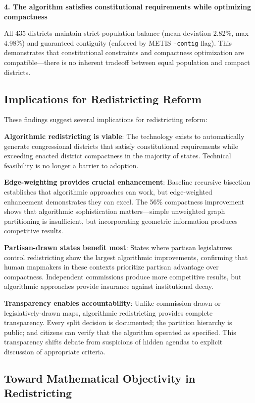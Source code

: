\textbf{4. The algorithm satisfies constitutional requirements while optimizing compactness}

All 435 districts maintain strict population balance (mean deviation 2.82\%, max 4.98\%) and guaranteed contiguity (enforced by METIS \texttt{-contig} flag). This demonstrates that constitutional constraints and compactness optimization are compatible—there is no inherent tradeoff between equal population and compact districts.

\subsection{Implications for Redistricting Reform}

These findings suggest several implications for redistricting reform:

\textbf{Algorithmic redistricting is viable}: The technology exists to automatically generate congressional districts that satisfy constitutional requirements while exceeding enacted district compactness in the majority of states. Technical feasibility is no longer a barrier to adoption.

\textbf{Edge-weighting provides crucial enhancement}: Baseline recursive bisection establishes that algorithmic approaches can work, but edge-weighted enhancement demonstrates they can excel. The 56\% compactness improvement shows that algorithmic sophistication matters—simple unweighted graph partitioning is insufficient, but incorporating geometric information produces competitive results.

\textbf{Partisan-drawn states benefit most}: States where partisan legislatures control redistricting show the largest algorithmic improvements, confirming that human mapmakers in these contexts prioritize partisan advantage over compactness. Independent commissions produce more competitive results, but algorithmic approaches provide insurance against institutional decay.

\textbf{Transparency enables accountability}: Unlike commission-drawn or legislatively-drawn maps, algorithmic redistricting provides complete transparency. Every split decision is documented; the partition hierarchy is public; and citizens can verify that the algorithm operated as specified. This transparency shifts debate from suspicions of hidden agendas to explicit discussion of appropriate criteria.

\subsection{Toward Mathematical Objectivity in Redistricting}

